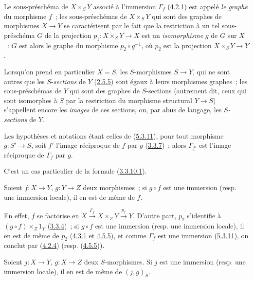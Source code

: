 Le sous-préschéma de $X\times_S Y$ associé à l'immersion $\Gamma_f$
(\hyperref[I.4.2.1-fr]{4.2.1}) est appelé \emph{le graphe} du morphisme $f$~;
les sous-préschémas de $X\times_S Y$ qui sont des graphes de morphismes
$X\to Y$ se caractérisent par le fait que la restriction à un tel
sous-préschéma $G$ de la projection $p_1:X\times_S Y\to X$ est un
\emph{isomorphisme} $g$ de $G$ sur $X$~: $G$ est alors le graphe du morphisme
$p_2\circ g^{-1}$, où $p_2$ est la projection $X\times_S Y\to Y$.

Lorsqu'on prend en particulier $X=S$, les $S$-morphismes $S\to Y$, qui ne
sont autres que les $S$-\emph{sections} de $Y$ (\hyperref[I.2.5.5-fr]{2.5.5}) sont
égaux à leurs morphismes graphes~; les sous-préschémas de $Y$ qui sont des
graphes de $S$-sections (autrement dit, ceux qui sont isomorphes à $S$ par la
restriction du morphisme structural $Y\to S$) s'appellent encore les
\emph{images} de ces sections, ou, par abus de langage, les
\emph{$S$-sections} de $Y$.

\begin{corollary}[5.3.12]
\label{I.5.3.12-fr}
Les hypothèses et notations étant celles de
(\hyperref[I.5.3.11-fr]{5.3.11}), pour tout morphisme $g:S'\to S$, soit $f'$
l'image réciproque de $f$ par $g$ (\hyperref[I.3.3.7-fr]{3.3.7})~; alors
$\Gamma_{f'}$ est l'image réciproque de $\Gamma_f$ par $g$.
\end{corollary}

C'est un cas particulier de la formule
(\hyperref[I.3.3.10.1-fr]{3.3.10.1}).

\begin{corollary}[5.3.13]
\label{I.5.3.13-fr}
Soient $f:X\to Y$, $g:Y\to Z$ deux morphismes~; si $g\circ f$ est une
immersion (\textup{resp.} une immersion locale), il en est de même de $f$.
\end{corollary}

En effet, $f$ se factorise en $X\xrightarrow{\Gamma_f}X\times_Z Y\xrightarrow{p_2}Y$. D'autre part, $p_2$ s'identifie à $(g\circ f)\times_Z 1_Y$
(\hyperref[I.3.3.4-fr]{3.3.4})~; si $g\circ f$ est une immersion (resp. une
immersion locale), il en est de même de $p_2$
(\hyperref[I.4.3.1-fr]{4.3.1} et \hyperref[I.4.5.5-fr]{4.5.5}), et comme
$\Gamma_f$ est une immersion (\hyperref[I.5.3.11-fr]{5.3.11}), on conclut
par (\hyperref[I.4.2.4-fr]{4.2.4}) (resp.
(\hyperref[I.4.5.5-fr]{4.5.5})).

\begin{corollary}[5.3.14]
\label{I.5.3.14-fr}
Soient $j:X\to Y$, $g:X\to Z$ deux $S$-morphismes. Si $j$ est une immersion
(\textup{resp.} une immersion locale), il en est de même de $(j,g)_S$.
\end{corollary}

